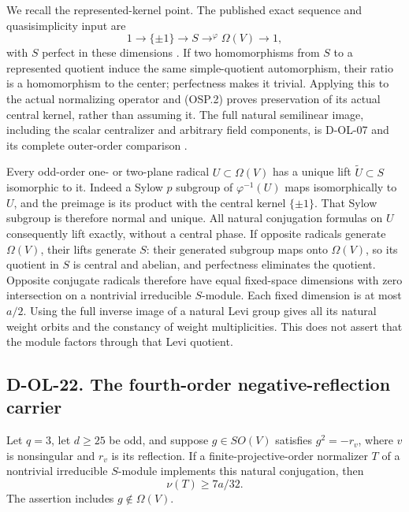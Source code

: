 We recall the represented-kernel point.  The published exact sequence
and quasisimplicity input are
\[
 1\longrightarrow\{\pm1\}\longrightarrow S
       \mathop{\longrightarrow}^{\varphi}\Omega(V)
       \longrightarrow1,                                  \tag{OSP.3}
\]
with $S$ perfect in these dimensions
\cite[proof of Theorem~4.3.6, Step~1, pp.~1918--1919]{HOS:LST2011}.
If two homomorphisms from $S$ to a represented quotient induce the
same simple-quotient automorphism, their ratio is a homomorphism
to the center; perfectness makes it trivial.  Applying this to
the actual normalizing operator and (OSP.2) proves preservation
of its actual central kernel, rather than assuming it.
The full natural semilinear image, including the scalar
centralizer and arbitrary field components, is D-OL-07 and its
complete outer-order comparison
\cite[Section~2.2.2, Table~2.1, p.~14]{HES:LiXia2022}.

Every odd-order one- or two-plane radical $U\subset\Omega(V)$
has a unique lift $\widetilde U\subset S$ isomorphic to it.
Indeed a Sylow $p$ subgroup of $\varphi^{-1}(U)$ maps
isomorphically to $U$, and the preimage is its product with
the central kernel $\{\pm1\}$.  That Sylow subgroup is
therefore normal and unique.  All natural conjugation formulas
on $U$ consequently lift exactly, without a central phase.
If opposite radicals generate $\Omega(V)$, their lifts
generate $S$: their generated subgroup maps onto $\Omega(V)$,
so its quotient in $S$ is central and abelian, and perfectness
eliminates the quotient.  Opposite conjugate radicals therefore
have equal fixed-space dimensions with zero intersection on a
nontrivial irreducible $S$-module.  Each fixed dimension is at
most $a/2$.  Using the full inverse image of a natural Levi
group gives all its natural weight orbits and the constancy of
weight multiplicities.  This does not assert that the module
factors through that Levi quotient.

\subsection*{D-OL-22. The fourth-order negative-reflection carrier}

\begin{lemma}[D-OL-22]
Let $q=3$, let $d\ge25$ be odd, and suppose
$g\in SO(V)$ satisfies $g^2=-r_v$, where $v$ is nonsingular
and $r_v$ is its reflection.  If a finite-projective-order
normalizer $T$ of a nontrivial irreducible $S$-module implements
this natural conjugation, then
\[
                              \nu(T)\ge7a/32.               \tag{OSP.4}
\]
The assertion includes $g\notin\Omega(V)$.
\end{lemma}

